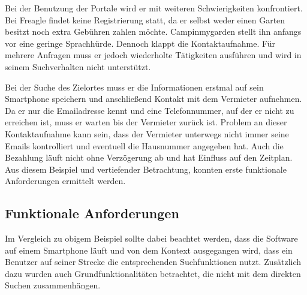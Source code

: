 Bei der Benutzung der Portale wird er mit weiteren Schwierigkeiten konfrontiert. Bei Freagle findet keine Registrierung statt, da er selbst weder einen Garten besitzt noch extra Gebühren zahlen möchte. Campinmygarden stellt ihn anfangs vor eine geringe Sprachhürde. Dennoch klappt die Kontaktaufnahme. Für mehrere Anfragen muss er jedoch wiederholte Tätigkeiten ausführen und wird in seinem Suchverhalten nicht unterstützt.

Bei der Suche des Zielortes muss er die Informationen erstmal auf sein Smartphone speichern und anschließend Kontakt mit dem Vermieter aufnehmen. Da er nur die Emailadresse kennt und eine Telefonnummer, auf der er nicht zu erreichen ist, muss er warten bis der Vermieter zurück ist. 
Problem an dieser Kontaktaufnahme kann sein, dass der Vermieter unterwegs nicht immer seine Emails kontrolliert und eventuell die Hausnummer angegeben hat. Auch die Bezahlung läuft nicht ohne Verzögerung ab und hat Einfluss auf den Zeitplan.\\

Aus diesem Beispiel und vertiefender Betrachtung, konnten erste funktionale Anforderungen ermittelt werden.
        	

\subsection{Funktionale Anforderungen}        	
Im Vergleich zu obigem Beispiel sollte dabei beachtet werden, dass die Software auf einem Smartphone läuft und von dem Kontext ausgegangen wird, dass ein Benutzer auf seiner Strecke die entsprechenden Suchfunktionen nutzt. Zusätzlich dazu wurden auch Grundfunktionalitäten betrachtet, die nicht mit dem direkten Suchen zusammenhängen.

